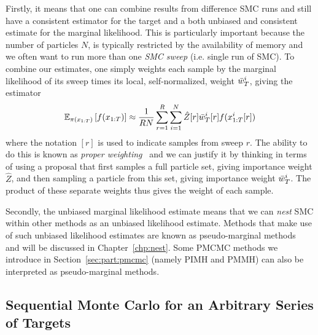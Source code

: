 Firstly, it means that one can combine
results from difference SMC runs and still have a consistent estimator for the target and a both unbiased and
consistent estimate for the marginal likelihood.
This is particularly important because the number of particles $N$, is typically restricted by the availability of memory
and we often want to run more than one \emph{SMC sweep} (i.e. single run of SMC).
To combine our estimates, one simply weights each sample by the marginal likelihood of its sweep times
its local, self-normalized, weight $\bar w_T^i$, giving the estimator
\begin{align}
\label{eq:part:ind-smc}
\mathbb{E}_{\pi (x_{1:T})} \left[f(x_{1:T})\right] \approx \frac{1}{RN} \sum_{r=1}^{R}\sum_{i=1}^{N} \hat{Z}[r] \bar w_T^i[r] f(x_{1:T}^i[r])
\end{align}
where the notation $[r]$ is used to indicate samples from sweep $r$.
 The ability to do this is known as \emph{proper weighting}~\citep{naessethLS2015nested} and we can justify it by
thinking in terms of using a proposal that first samples a full particle set, giving importance weight $\hat Z$, and then sampling a particle
from this set, giving importance weight $\bar w_T^i$.  The product of these separate weights thus gives the weight of
each sample.  

Secondly, the unbiased marginal likelihood estimate means that we can \emph{nest} SMC within other 
methods as an unbiased likelihood estimate.
Methods that make use of such unbiased likelihood estimates are known as pseudo-marginal
methods~\citep{andrieu2009pseudo} and will be discussed in Chapter~\ref{chp:nest}.
Some PMCMC methods we introduce in Section~\ref{sec:part:pmcmc} (namely PIMH and PMMH) 
can also be interpreted as pseudo-marginal methods.
%

\subsection{Sequential Monte Carlo for an Arbitrary Series of Targets}
\label{sec:part:smc:arb}

